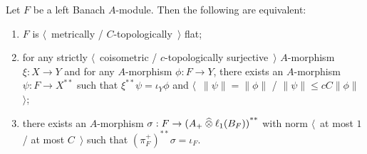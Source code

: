 \begin{proposition}\label{MetTopFlatSecondDualCharac} Let $F$ be a left Banach
$A$-module. Then the following are equivalent:

\begin{enumerate}[label = (\roman*)]
    \item $F$ is $\langle$~metrically / $C$-topologically~$\rangle$ flat;

    \item for any strictly $\langle$~coisometric / $c$-topologically
    surjective~$\rangle$ $A$-morphism $\xi:X\to Y$ and for any $A$-morphism
    $\phi:F\to Y$, there exists an $A$-morphism $\psi:F\to X^{**}$ such that
    $\xi^{**}\psi=\iota_Y\phi$ and $\langle$~$\lVert\psi\rVert=\lVert\phi\rVert$ /
    $\lVert\psi\rVert\leq cC\lVert\phi\rVert$~$\rangle$;

    \item there exists an $A$-morphism $\sigma:F\to {(A_+\mathbin{\widehat{\otimes}}\ell_1(B_F))}^{**}$ with norm $\langle$~at most $1$ / at most $C$~$\rangle$
    such that ${(\pi_F^+)}^{**}\sigma=\iota_F$.
\end{enumerate}
\end{proposition}
